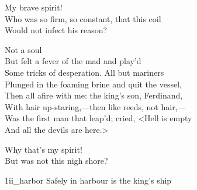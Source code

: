 \begin{verse_speech}[Prospero] 
My brave spirit!\\
Who was so firm, so constant, that this coil\\
Would not infect his reason?
\end{verse_speech}

\begin{verse_speech}[Ariel] 
Not a soul\\
But felt a fever of the mad and play'd\\
Some tricks of desperation. All but mariners\\
Plunged in the foaming brine and quit the vessel,\\
Then all afire with me: the king's son, Ferdinand,\\
With hair up-staring,—then like reeds, not hair,—\\
Was the first man that leap'd; cried, <Hell is empty\\
And all the devils are here.>
\end{verse_speech}

\begin{letter}
	\enlargethispage{\baselineskip}
\end{letter}

\begin{verse_speech}[Prospero] 
Why that's my spirit!\\
But was not this nigh shore?
\end{verse_speech}


\begin{pictures} %
	\begin{letter}
		\begin{colorbigpic}
			[1.1]
			{1ii_harbor}
			{Safely in harbour is the king's ship}
		\end{colorbigpic}
	\end{letter}
\end{pictures}


	
	
